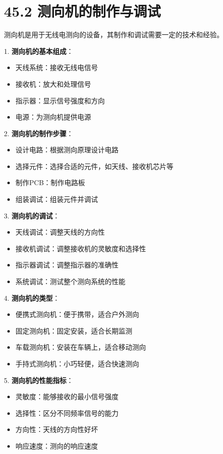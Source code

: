 \documentclass[12pt,UTF8]{ctexbook}
\begin{document}
\section*{45.2 测向机的制作与调试}

测向机是用于无线电测向的设备，其制作和调试需要一定的技术和经验。

1. \textbf{测向机的基本组成}：
   \begin{itemize}[leftmargin=3.5em]
   \item 天线系统：接收无线电信号
   \item 接收机：放大和处理信号
   \item 指示器：显示信号强度和方向
   \item 电源：为测向机提供电源
   \end{itemize}

2. \textbf{测向机的制作步骤}：
   \begin{itemize}[leftmargin=3.5em]
   \item 设计电路：根据测向原理设计电路
   \item 选择元件：选择合适的元件，如天线、接收机芯片等
   \item 制作PCB：制作电路板
   \item 组装调试：组装元件并调试
   \end{itemize}

3. \textbf{测向机的调试}：
   \begin{itemize}[leftmargin=3.5em]
   \item 天线调试：调整天线的方向性
   \item 接收机调试：调整接收机的灵敏度和选择性
   \item 指示器调试：调整指示器的准确性
   \item 系统调试：测试整个测向系统的性能
   \end{itemize}

4. \textbf{测向机的类型}：
   \begin{itemize}[leftmargin=3.5em]
   \item 便携式测向机：便于携带，适合户外测向
   \item 固定测向机：固定安装，适合长期监测
   \item 车载测向机：安装在车辆上，适合移动测向
   \item 手持式测向机：小巧轻便，适合快速测向
   \end{itemize}

5. \textbf{测向机的性能指标}：
   \begin{itemize}[leftmargin=3.5em]
   \item 灵敏度：能够接收的最小信号强度
   \item 选择性：区分不同频率信号的能力
   \item 方向性：天线的方向性好坏
   \item 响应速度：测向的响应速度
   \end{itemize}
\end{document}
